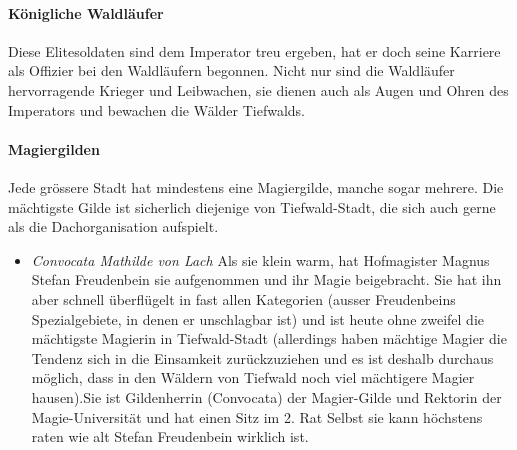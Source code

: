 \documentclass[12pt,twoside,twocolumn,openany]{book}
\begin{document}


\paragraph{Königliche Waldläufer} Diese Elitesoldaten sind dem Imperator treu ergeben, hat er doch seine Karriere als Offizier bei den Waldläufern begonnen. Nicht nur sind die Waldläufer hervorragende Krieger und Leibwachen, sie dienen auch als Augen und Ohren des Imperators und bewachen die Wälder Tiefwalds.

\paragraph{Magiergilden} Jede grössere Stadt hat mindestens eine Magiergilde, manche sogar mehrere. Die mächtigste Gilde ist sicherlich diejenige von Tiefwald-Stadt, die sich auch gerne als die Dachorganisation aufspielt.
\begin{itemize}
	\item\textit{Convocata Mathilde von Lach} Als sie klein warm, hat Hofmagister Magnus Stefan Freudenbein sie aufgenommen und ihr Magie beigebracht. Sie hat ihn aber schnell überflügelt in fast allen Kategorien (ausser Freudenbeins Spezialgebiete, in denen er unschlagbar ist) und ist heute ohne zweifel die mächtigste Magierin in Tiefwald-Stadt (allerdings haben mächtige Magier die Tendenz sich in die Einsamkeit zurückzuziehen und es ist deshalb durchaus möglich, dass in den Wäldern von Tiefwald noch viel mächtigere Magier hausen).Sie ist Gildenherrin (Convocata) der Magier-Gilde und Rektorin der Magie-Universität und hat einen Sitz im 2. Rat
	Selbst sie kann höchstens raten wie alt Stefan Freudenbein wirklich ist.
\end{itemize}
\end{document}
